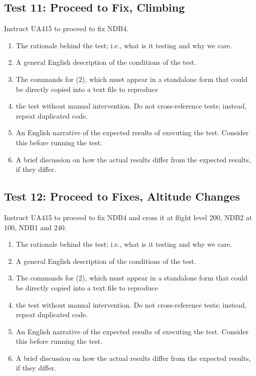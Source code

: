 \documentclass[letterpaper, 12pt]{article}
\begin{document}
\subsection{Test 11: Proceed to Fix, Climbing}
Instruct UA415 to proceed to fix NDB4.
\begin{enumerate}
\item The rationale behind the test; i.e., what is it testing and why we care.
\item A general English description of the conditions of the test.
\item The commands for (2), which must appear in a standalone form that could be directly copied into a text file to reproduce
\item the test without manual intervention. Do not cross-reference tests; instead, repeat duplicated code.
\item An English narrative of the expected results of executing the test. Consider this before running the test.
\item A brief discussion on how the actual results differ from the expected results, if they differ.
\end{enumerate}

\subsection{Test 12: Proceed to Fixes, Altitude Changes}
Instruct UA415 to proceed to fix NDB4 and cross it at flight level 200, NDB2 at 100, NDB1 and 240.
\begin{enumerate}
\item The rationale behind the test; i.e., what is it testing and why we care.
\item A general English description of the conditions of the test.
\item The commands for (2), which must appear in a standalone form that could be directly copied into a text file to reproduce
\item the test without manual intervention. Do not cross-reference tests; instead, repeat duplicated code.
\item An English narrative of the expected results of executing the test. Consider this before running the test.
\item A brief discussion on how the actual results differ from the expected results, if they differ.
\end{enumerate}
\end{document}
